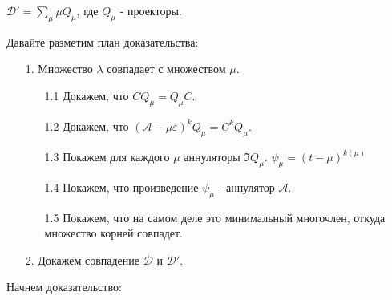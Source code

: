 $\mathcal{D'} = \sum\limits_{\mu}\mu Q_\mu$, где $Q_{\mu}$ - проекторы.

Давайте разметим план доказательства:
\begin{enumerate}
    \item[1.] Множество $\lambda$ совпадает с множеством $\mu$.
    \begin{enumerate}
        \item[1.1] Докажем, что $CQ_{\mu}=Q_{\mu}C$.
        \item[1.2] Докажем, что $(\mathcal{A-\mu\varepsilon})^kQ_{\mu} = C^kQ_{\mu}$.
        \item[1.3] Покажем для каждого $\mu$ аннуляторы $\Im Q_{\mu}$. $\psi_{\mu} = (t-\mu)^{k(\mu)}$ 
        \item[1.4] Покажем, что произведение $\psi_{\mu}$ - аннулятор $\mathcal{A}$.
        \item[1.5] Покажем, что на самом деле это минимальный многочлен, откуда множество корней совпадет.
    \end{enumerate}
    \item [2.] Докажем совпадение $\mathcal{D}$ и $\mathcal{D}'$.
\end{enumerate}
Начнем доказательство:
